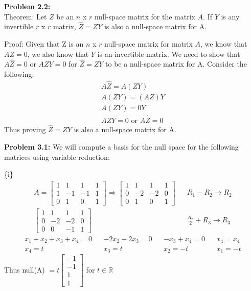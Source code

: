 \documentclass{article}
\begin{document}
 
\pagestyle{fancy}

\textbf{Problem 2.2:} \\
Theorem: Let $Z$ be an $n$ x $r$ null-space matrix for the matrix $A$. If $Y$ is any invertible $r$ x $r$ matrix,  $\hat{Z} = ZY$ is also a null-space matrix for A.

Proof: Given that Z is an $n$ x $r$ null-space matrix for matrix $A$, we know that $AZ = 0$, we also know that $Y$ is an invertible matrix. We need to show that $A\hat{Z} = 0$ or $AZY = 0$ for $\hat{Z} = ZY$ to be a null-space matrix for A. Consider the following:
\begin{align*}
    A \hat{Z} = A(ZY) \\
    A(ZY) = (AZ)Y \\
    A(ZY) = 0Y \\
    AZY = 0 \text{ or } A\hat{Z} = 0
\end{align*}
Thus proving $\hat{Z} = ZY$ is also a null-space matrix for A. \newline

\textbf{Problem 3.1:} We will compute a basis for the null space for the following matrices using variable reduction:

\{i\}
\begin{align*} A =
    \begin{bmatrix}
        1 & 1 & 1 & 1 \\
        1 & -1 & -1 & 1 \\
        0 & 1 & 0 & 1
    \end{bmatrix} \Rightarrow
    \begin{bmatrix}
        1 & 1 & 1 & 1 \\
        0 & -2 & -2 & 0 \\
        0 & 1 & 0 & 1
    \end{bmatrix} && R_1 - R_2 \xrightarrow{} R_2 \\
    \begin{bmatrix}
        1 & 1 & 1 & 1 \\
        0 & -2 & -2 & 0 \\
        0 & 0 & -1 & 1
    \end{bmatrix} && \frac{R_2}{2} + R_3 \xrightarrow{} R_3 
\end{align*}\begin{align*}
    x_1 + x_2 + x_3 + x_4 = 0 && -2x_2 - 2x_3 = 0 && -x_3 + x_4 = 0 && x_4 = x_4 \\
    x_4 = t && x_3 = t && x_2 = -t && x_1 = -t
\end{align*}
Thus null(A) $ = t\begin{bmatrix} -1 \\ -1 \\ 1 \\ 1\end{bmatrix}$ for $t \in \mathbb{R}$ \newline
\end{document}
